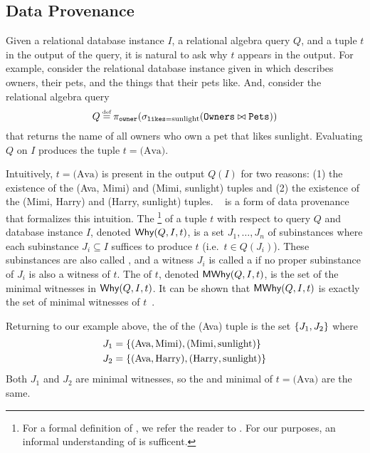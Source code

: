 \subsection{Data Provenance}
Given a relational database instance $I$, a relational algebra query $Q$, and a
tuple $t$ in the output of the query, it is natural to ask why $t$ appears in
the output. For example, consider the relational database instance given in
 which describes owners, their pets, and the things that
their pets like. 
And, consider the relational algebra query
\[
  Q \defeq \pi_{\ttt{owner}}(
             \sigma_{\ttt{likes} = \text{sunlight}}(
               \ttt{Owners} \join \ttt{Pets}
             )
           )
\]
that returns the name of all owners who own a pet that likes sunlight.
Evaluating $Q$ on $I$ produces the tuple $t = \text{(Ava)}$.

{}

Intuitively, $t = \text{(Ava)}$ is present in the output $Q(I)$ for two
reasons: (1) the existence of the (Ava, Mimi) and (Mimi, sunlight) tuples and
(2) the existence of the (Mimi, Harry) and (Harry, sunlight) tuples.
~\cite{buneman2001and, cheney2009provenance} is a
form of data provenance that formalizes this intuition. The
\whyprovenance{}\footnote{
  For a formal definition of \whyprovenance{}, we refer the reader to
  \cite{cheney2009provenance}. For our purposes, an informal understanding of
  \whyprovenance{} is sufficent.
}
of a tuple $t$ with respect to query $Q$ and database instance $I$, denoted
$\textsf{Why}(Q, I, t)$, is a set $J_1, \ldots, J_n$ of subinstances where each
subinstance $J_i \subseteq I$ suffices to produce $t$ (i.e.\ $t \in Q(J_i)$).
These subinstances are also called , and a witness
$J_i$ is called a  if no proper subinstance of
$J_i$ is also a witness of $t$. The  of $t$,
denoted $\textsf{MWhy}(Q, I, t)$, is the set of the minimal witnesses in $\textsf{Why}(Q, I,
t)$. It can be shown that $\textsf{MWhy}(Q, I, t)$ is exactly the set of minimal
witnesses of $t$~\cite{cheney2009provenance}.

Returning to our example above, the \whyprovenance{} of the (Ava) tuple is the
set $\{J_1, J_2\}$ where
\begin{align*}
  J_1 &= \{(\text{Ava}, \text{Mimi}), (\text{Mimi}, \text{sunlight})\} \\
  J_2 &= \{(\text{Ava}, \text{Harry}), (\text{Harry}, \text{sunlight})\}
\end{align*}
Both $J_1$ and $J_2$ are minimal witnesses, so the \whyprovenance{} and minimal
\whyprovenance{} of $t = \text{(Ava)}$ are the same.

